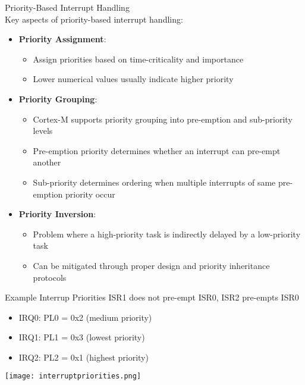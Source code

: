\begin{concept}{Priority-Based Interrupt Handling}\\
Key aspects of priority-based interrupt handling:
\begin{itemize}
    \item \textbf{Priority Assignment}:
    \begin{itemize}
        \item Assign priorities based on time-criticality and importance
        \item Lower numerical values usually indicate higher priority
    \end{itemize}
    \item \textbf{Priority Grouping}:
    \begin{itemize}
        \item Cortex-M supports priority grouping into pre-emption and sub-priority levels
        \item Pre-emption priority determines whether an interrupt can pre-empt another
        \item Sub-priority determines ordering when multiple interrupts of same pre-emption priority occur
    \end{itemize}
    \item \textbf{Priority Inversion}:
    \begin{itemize}
        \item Problem where a high-priority task is indirectly delayed by a low-priority task
        \item Can be mitigated through proper design and priority inheritance protocols
    \end{itemize}
\end{itemize}
\end{concept}

\begin{theorem}{Example Interrup Priorities}
    ISR1 does not pre-empt ISR0, ISR2 pre-empts ISR0
    \begin{itemize}
        \item IRQ0: PL0 = 0x2  (medium priority)
        \item IRQ1: PL1 = 0x3  (lowest priority)
        \item IRQ2: PL2 = 0x1  (highest priority)
    \end{itemize}
    \texttt{[image: interruptpriorities.png]}
\end{theorem}

